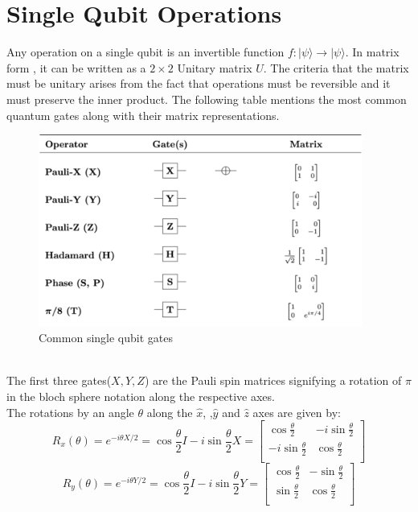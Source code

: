 \section{Single Qubit Operations}
Any operation on a single qubit is an invertible function $f:|\psi\rangle \rightarrow |\psi \rangle$. In matrix form , it can be written as a $2 \times 2$ Unitary matrix $U$. The criteria that the matrix must be unitary arises from the fact that operations must be reversible and it must preserve the inner product. The following table mentions the most common quantum gates along with their matrix representations.
\begin{figure}[h]
\centering
\includegraphics[width=0.95\textwidth]{images/singlegates.png}\par
\label{singlegates}
\caption{Common single qubit gates}
\end{figure}
\\The first three gates($X,Y,Z$) are the Pauli spin matrices signifying a rotation of $\pi$ in the bloch sphere notation along the respective axes.\\
The rotations by an angle $\theta$ along the $\hat{x}$, ,$\hat{y}$ and $\hat{z}$ axes are given by:
\begin{equation}
R_x(\theta) = e^{-i\theta X/2} = \cos{\frac{\theta}{2}}I - i\sin{\frac{\theta}{2}}X = \left[ {\begin{array}{cc}
   \cos{\frac{\theta}{2}} & -i\sin{\frac{\theta}{2}} \\
   -i\sin{\frac{\theta}{2}} & \cos{\frac{\theta}{2}} \\
  \end{array} } \right]
\end{equation}
\begin{equation}
R_y(\theta) = e^{-i\theta Y/2} = \cos{\frac{\theta}{2}}I - i\sin{\frac{\theta}{2}}Y = \left[ {\begin{array}{cc}
   \cos{\frac{\theta}{2}} & -\sin{\frac{\theta}{2}} \\
   \sin{\frac{\theta}{2}} & \cos{\frac{\theta}{2}} \\
  \end{array} } \right]
\end{equation}
